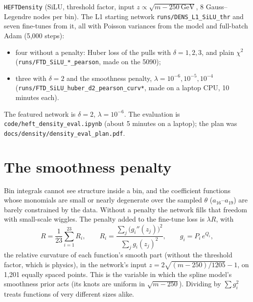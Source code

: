 \documentclass[11pt]{article}
\newcommand{\file}[1]{\nolinkurl{#1}}
\newcommand{\code}[1]{\texttt{#1}}
\begin{document}
\code{HEFTDensity} (SiLU, threshold factor, input $z \propto \sqrt{m - 250~\text{GeV}}$, 8 Gauss--Legendre
nodes per bin). The L1 starting network \file{runs/DENS_L1_SiLU_thr} and seven fine-tunes from it, all
with Poisson variances from the model and full-batch Adam (5,000 steps):
\begin{itemize}
  \item four without a penalty: Huber loss of the pulls with $\delta = 1, 2, 3$, and plain $\chi^2$
    (\file{runs/FTD_SiLU_*_pearson}, made on the 5090);
  \item three with $\delta = 2$ and the smoothness penalty, $\lambda = 10^{-6}, 10^{-5}, 10^{-4}$
    (\file{runs/FTD_SiLU_huber_d2_pearson_curv*}, made on a laptop CPU, 10 minutes each).
\end{itemize}
The featured network is $\delta = 2$, $\lambda = 10^{-6}$. The evaluation is
\file{code/heft_density_eval.ipynb} (about 5 minutes on a laptop); the plan was
\file{docs/density/density_eval_plan.pdf}.

\section{The smoothness penalty}

Bin integrals cannot see structure inside a bin, and the coefficient functions whose monomials are
small or nearly degenerate over the sampled $\theta$ ($a_{16}$--$a_{19}$) are barely constrained by the
data. Without a penalty the network fills that freedom with small-scale wiggles. The penalty added to
the fine-tune loss is $\lambda R$, with
\begin{equation}
  R = \frac{1}{23}\sum_{i=1}^{23} R_i, \qquad
  R_i = \frac{\sum_j \big(g_i''(z_j)\big)^2}{\sum_j g_i(z_j)^2}, \qquad g_i = P_i\,e^{Q_i},
\end{equation}
the relative curvature of each function's smooth part (without the threshold factor, which is
physics), in the network's input $z = 2\sqrt{(m - 250)/1205} - 1$, on 1,201 equally spaced points. This is
the variable in which the spline model's smoothness prior acts (its knots are uniform in
$\sqrt{m - 250}$). Dividing by $\sum g_i^2$ treats functions of very different sizes alike.
\end{document}
